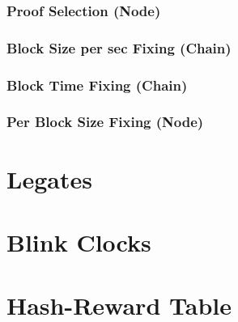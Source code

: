 \documentclass[a4paper,11pt]{article}
\begin{document}
\subsubsection{Proof Selection (Node)}
\subsubsection{Block Size per sec Fixing (Chain)}
\subsubsection{Block Time Fixing (Chain)}
\subsubsection{Per Block Size Fixing (Node)}

\section{Legates}


\section{Blink Clocks}


\section{Hash-Reward Table}
\end{document}

